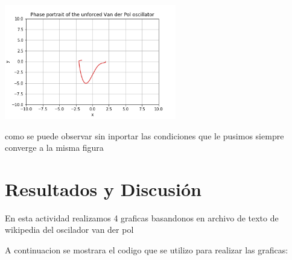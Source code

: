 \documentclass{article}
\begin{document}
\begin{center}
\includegraphics[height=5cm]{extra5.png}
\end{center}


como se puede observar sin inportar las condiciones que le pusimos siempre converge a la misma figura


\section{Resultados y Discusión}

En esta actividad realizamos 4 graficas basandonos en archivo de texto de wikipedia del oscilador van der pol

A continuacion se mostrara el codigo que se utilizo para realizar las graficas:
\end{document}
